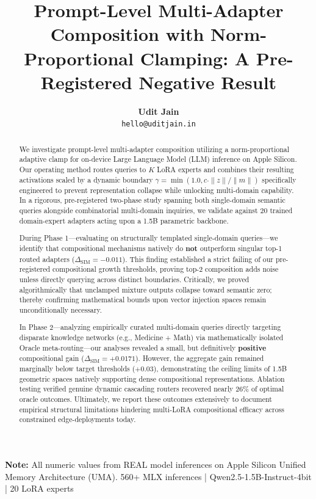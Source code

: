 \documentclass[11pt]{article}
\title{\textbf{Prompt-Level Multi-Adapter Composition with Norm-Proportional Clamping: A Pre-Registered Negative Result}}
\author{
  \textbf{Udit Jain} \\
  \texttt{hello@uditjain.in} \\
}
\date{}
\begin{document}
\maketitle

\begin{mdframed}[linewidth=1pt, backgroundcolor=gray!10]
\textbf{Note:} All numeric values from REAL model inferences on Apple Silicon Unified Memory Architecture (UMA).
560+ MLX inferences | Qwen2.5-1.5B-Instruct-4bit | 20 LoRA experts
\end{mdframed}

\vspace{0.5cm}

\begin{abstract}
We investigate prompt-level multi-adapter composition utilizing a norm-proportional adaptive clamp for on-device Large Language Model (LLM) inference on Apple Silicon. Our operating method routes queries to $K$ LoRA experts and combines their resulting activations scaled by a dynamic boundary $\gamma = \min(1.0, c \cdot \|z\| / \|m\|)$ specifically engineered to prevent representation collapse while unlocking multi-domain capability. In a rigorous, pre-registered two-phase study spanning both single-domain semantic queries alongside combinatorial multi-domain inquiries, we validate against 20 trained domain-expert adapters acting upon a 1.5B parametric backbone. 

During Phase 1---evaluating on structurally templated single-domain queries---we identify that compositional mechanisms natively do \textbf{not} outperform singular top-1 routed adapters ($\Delta_{\text{SIM}} = -0.011$). This finding established a strict failing of our pre-registered compositional growth thresholds, proving top-2 composition adds noise unless directly querying across distinct boundaries. Critically, we proved algorithmically that unclamped mixture outputs collapse toward semantic zero; thereby confirming mathematical bounds upon vector injection spaces remain unconditionally necessary.

In Phase 2---analyzing empirically curated multi-domain queries directly targeting disparate knowledge networks (e.g., Medicine + Math) via mathematically isolated Oracle meta-routing---our analyses revealed a small, but definitively \textbf{positive} compositional gain ($\Delta_{\text{SIM}} = +0.0171$). However, the aggregate gain remained marginally below target thresholds ($+0.03$), demonstrating the ceiling limits of 1.5B geometric spaces natively supporting dense compositional representations. Ablation testing verified genuine dynamic cascading routers recovered nearly 26\% of optimal oracle outcomes. Ultimately, we report these outcomes extensively to document empirical structural limitations hindering multi-LoRA compositional efficacy across constrained edge-deployments today.
\end{abstract}
\end{document}
